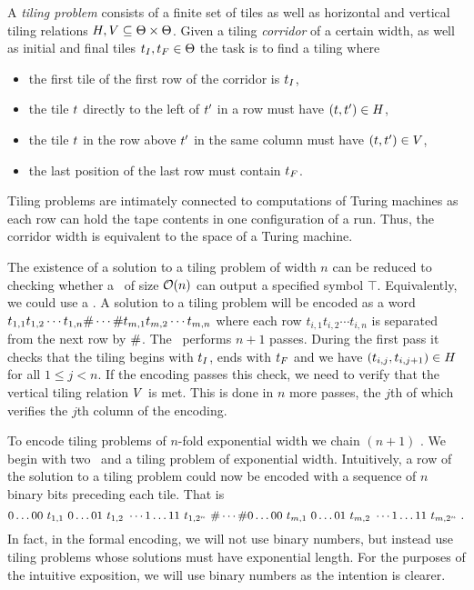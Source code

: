 A \emph{tiling problem} consists of a finite set of tiles \tiles as well as horizontal and vertical tiling relations 
$H, V \subseteq \Theta \times \Theta$.
Given a tiling \emph{corridor} of a certain width, as well as initial and final tiles
$t_I, t_F \in \Theta$
the task is to find a tiling where 
\begin{itemize}
\item
    the first tile of the first row of the corridor is $t_I$, 
\item
    the tile $t$ directly to the left of $t'$ in a row must have
    $\left( t, t' \right) \in H$,
\item
    the tile $t$ in the row above $t'$ in the same column must have
    $\left( t, t' \right) \in V$,
\item
    the last position of the last row must contain $t_F$.
\end{itemize}
Tiling problems are intimately connected to computations of Turing machines as
each row can hold the tape contents in one configuration of a run.
Thus, the corridor width is equivalent to the space of a Turing machine.

The existence of a solution to a tiling problem of width $n$ can be reduced to checking whether a \FFT\ of size 
${\mathcal{O}}\mathord{\left( n \right)}$ 
can output a specified symbol $\top$.
Equivalently, we could use a \FFA.
A solution to a tiling problem will be encoded as a word 
$t_{1,1} t_{1,2} \cdots t_{1,n} \# \cdots \# t_{m,1} t_{m,2} \cdots t_{m,n}$
where each row
$t_{i,1} t_{i,2} \cdots t_{i,n}$
is separated from the next row by $\#$.
The \FFT\ performs $n+1$ passes.
During the first pass it checks that the tiling begins with $t_I$, ends with $t_F$ and we have 
$\left( t_{i,j}, t_{i,j+1} \right) \in H$
for all
$1 \leq j < n$.
If the encoding passes this check, we need to verify that the vertical tiling relation $V$ is met.
This is done in $n$ more passes, the $j$th of which verifies the $j$th column of the encoding.

To encode tiling problems of $n$-fold exponential width we chain $(n+1)$ \FFT.
We begin with two \FFT\ and a tiling problem of exponential width.
Intuitively, a row of the solution to a tiling problem could now be encoded with a sequence of $n$ binary bits preceding each tile.
That is
\[
    0\ldots00\ \tile_{1,1}\ %
    0\ldots01\ \tile_{1,2}\ %
    \cdots
    1\ldots11\ \tile_{1,2^n}\ %
    \numsep
    \cdots
    \numsep
    0\ldots00\ \tile_{m,1}\ %
    0\ldots01\ \tile_{m,2}\ %
    \cdots
    1\ldots11\ \tile_{m,2^n} \ .
\]
In fact, in the formal encoding, we will not use binary numbers, but instead use tiling problems whose solutions must have exponential length.
For the purposes of the intuitive exposition, we will use binary numbers as the intention is clearer.


